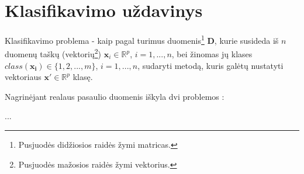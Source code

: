 \section{Klasifikavimo uždavinys}

Klasifikavimo problema - kaip pagal turimus duomenis\footnote{Pusjuodės
didžiosios raidės žymi matricas.} $\bm{D}$, kurie susideda iš $n$ duomenų taškų
(vektorių\footnote{Pusjuodės mažosios raidės žymi vektorius.}) $\bm{x}_i \in
\mathbb{R}^p$, $i = 1, ..., n$, bei žinomas jų klases $class(\bm{x_i}) \in
\{1, 2, ..., m\}$, $i = 1, ..., n$, sudaryti metodą, kuris galėtų nustatyti vektoriaus
$\bm{x'} \in \mathbb{R}^p$ klasę.

Nagrinėjant realaus pasaulio duomenis iškyla dvi problemos \cite{RountreePhDThesis}:

...
